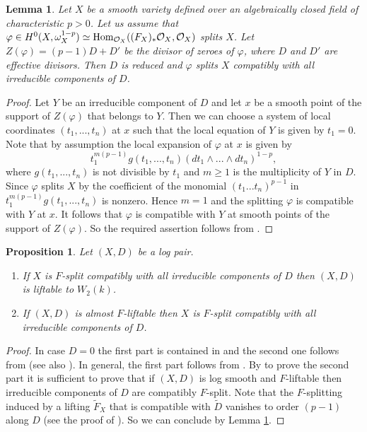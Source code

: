 \documentclass[12pt]{article}
\theoremstyle{plain}
\newtheorem{Proposition}[Thm]{\sc Proposition}
\newtheorem{Lemma}[Thm]{\sc Lemma}
\theoremstyle{definition}
\theoremstyle{remark}
\newcommand{\cO}{{\mathcal O}}
\newcommand{\Hom}{{\mathop{{\rm Hom}}}}
\begin{document}
\begin{Lemma}\label{generalized-BK}
	Let $X$ be a smooth variety defined over an algebraically closed field of characteristic $p>0$.
	Let	us assume that $\varphi \in H^0(X, \omega_X^{1-p})\simeq \Hom _{\cO_X} ((F_X)_*\cO_X, \cO_X)$ splits $X$. Let $Z(\varphi)=(p-1)D+D'$ be the divisor of zeroes of $\varphi$, where $D$ and $D'$
	are effective divisors. Then $D$ is reduced and $\varphi$ splits $X$ compatibly with all irreducible components of $D$. 
\end{Lemma}

\begin{proof}
	Let $Y$ be an irreducible component of $D$ and let $x$ be a smooth point of the support of $Z(\varphi)$ that belongs to $Y$. Then we can choose a system of local coordinates $(t_1,...,t_n)$ at $x$ such that the local equation of $Y$ is given by $t_1=0$.
	Note that by assumption the local expansion of $\varphi$ at $x$ is given by
	$$t_1^{m(p-1)}g(t_1,...,t_n)(dt_1\wedge ...\wedge dt_n)^{1-p},$$ 
	where $g(t_1,...,t_n)$ is not divisible by $t_1$ and $m\ge 1$ is the multiplicity of $Y$ in $D$.	
	Since $\varphi $ splits $X$  by \cite[Theorem 1.3.8]{BK} the coefficient of the monomial $(t_1...t_n)^{p-1}$ in $t_1^{m(p-1)}g(t_1,...,t_n)$ is nonzero. Hence $m=1$  and the splitting $\varphi$ is compatible with $Y$ at $x$. It follows that $\varphi$ is compatible with $Y$ at smooth points of the support of $ Z (\varphi)$. So the required assertion follows from \cite[Lemma 1.1.7, (ii)]{BK}. 
\end{proof}

\medskip

\begin{Proposition}\label{liftable-split}
	Let $(X,D)$ be a log pair.
	\begin{enumerate}
		\item 
		If $X$ is $F$-split  compatibly with all irreducible components of $D$ then  $(X,D)$ is liftable to $W_2(k)$.		
		\item  
		If $(X,D)$ is almost $F$-liftable then $X$ is $F$-split compatibly with all irreducible components of $D$.
	\end{enumerate}
\end{Proposition}

\begin{proof}
	In case $D=0$ the first part is contained in \cite[Proposition 4]{La3}
	and the second one  follows from \cite[Theorem 2]{BTLM} (see also \cite[Section 2]{AWZ2}).
	In general, the first part follows from \cite[Lemma 5.2.1]{AZ}.	 
	 By \cite[Lemma 1.1.7, (ii) and (iii)]{BK} to prove the second part it is sufficient to prove that if $(X,D)$ is log smooth and $F$-liftable then irreducible components of $D$ are compatibly $F$-split. 
	Note that the $F$-splitting induced by a lifting $\tilde F_X$ that is compatible with $\tilde D$
	vanishes to order $(p-1)$ along $D$ (see the proof of \cite[Lemma 3.1]{AWZ2}). So we can conclude by Lemma \ref{generalized-BK}.
\end{proof}
\end{document}
